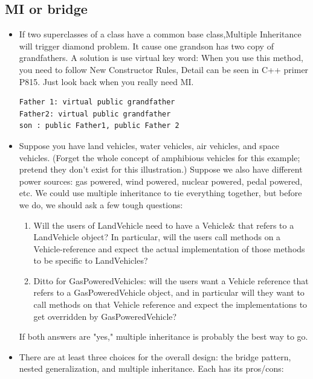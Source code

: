 \documentclass[a4paper,11pt,twoside]{book}
\begin{document}
\subsection{MI or bridge}
\begin{itemize}
    
	\item If two superclasses of a class have a common base class,Multiple Inheritance will trigger diamond problem. It cause one grandson has two copy of grandfathers. A solution is use virtual key word: When you use this method, you need to follow New Constructor Rules, Detail can be seen in C++ primer P815.  Just look back when you really need MI.

\begin{lstlisting}[numbers=none]
Father 1: virtual public grandfather
Father2: virtual public grandfather
son : public Father1, public Father 2
\end{lstlisting}
	
	\item Suppose you have land vehicles, water vehicles, air vehicles, and space vehicles. (Forget the whole concept of amphibious vehicles for this example; pretend they don't exist for this illustration.) Suppose we also have different power sources: gas powered, wind powered, nuclear powered, pedal powered, etc. We could use multiple inheritance to tie everything together, but before we do, we should ask a few tough questions:
	
	\begin{enumerate}
		\item Will the users of LandVehicle need to have a Vehicle\& that refers to a LandVehicle object? In particular, will the users call methods on a Vehicle-reference and expect the actual implementation of those methods to be specific to LandVehicles?
		
		\item Ditto for GasPoweredVehicles: will the users want a Vehicle reference that refers to a GasPoweredVehicle object, and in particular will they want to call methods on that Vehicle reference and expect the implementations to get overridden by GasPoweredVehicle?
	\end{enumerate}
	If both answers are "yes," multiple inheritance is probably the best way to go.
	
	\item There are at least three choices for the overall design: the bridge pattern, nested generalization, and multiple inheritance. Each has its pros/cons:
	

\end{itemize}
\end{document}
